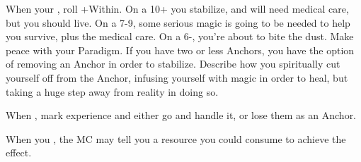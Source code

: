 \begin{multicols}{3}
\begin{move}
  \end{move}

  \SEPARATOR
  

  \begin{move}
    When your , roll +Within. On a 10+ you stabilize, and will need medical care, but you should live. On a 7-9, some serious magic is going to be needed to help you survive, plus the medical care. On a 6-, you’re about to bite the dust. Make peace with your Paradigm. If you have two or less Anchors, you have the option of removing an Anchor in order to stabilize. Describe how you spiritually cut yourself off from the Anchor, infusing yourself with magic in order to heal, but taking a huge step away from reality in doing so.

  \end{move}


  \SEPARATOR

  \begin{move}
    When , mark experience and either go and handle it, or lose them as an Anchor.

  \end{move}

  \SEPARATOR

  \begin{move}
    When you , the MC may tell you a resource you could consume to achieve the effect.

  \end{move}

\end{multicols}
